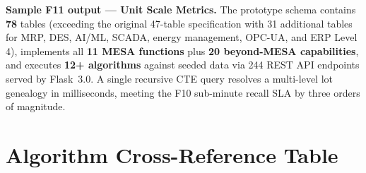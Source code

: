 \documentclass[11pt]{article}
\begin{document}
\textbf{Sample F11 output --- Unit Scale Metrics.}  The prototype schema contains \textbf{78} tables (exceeding the original 47-table specification with 31 additional tables for MRP, DES, AI/ML, SCADA, energy management, OPC-UA, and ERP Level 4), implements all \textbf{11 MESA functions} plus \textbf{20 beyond-MESA capabilities}, and executes \textbf{12+ algorithms} against seeded data via 244 REST API endpoints served by Flask~3.0.  A single recursive CTE query resolves a multi-level lot genealogy in milliseconds, meeting the F10 sub-minute recall SLA by three orders of magnitude.


\section{Algorithm Cross-Reference Table}\label{sec:algxref}
\end{document}
